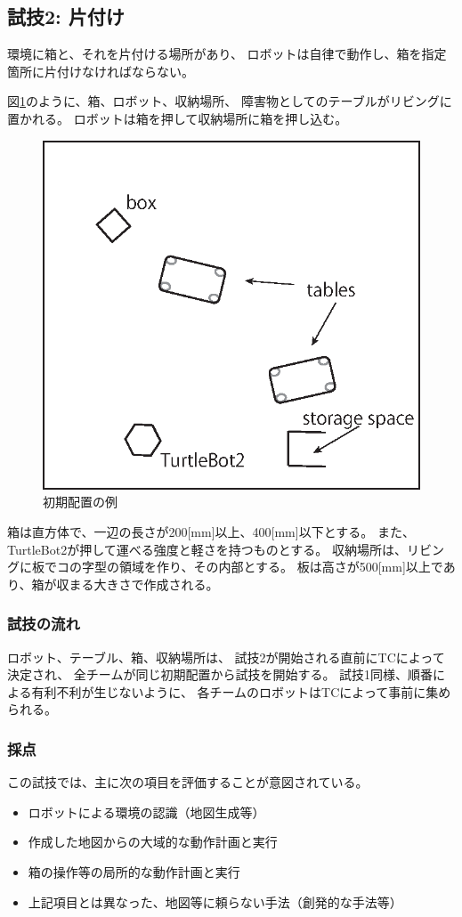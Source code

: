 \documentclass[a4j]{jarticle}
\begin{document}
\subsection{試技2: 片付け}

環境に箱と、それを片付ける場所があり、
ロボットは自律で動作し、箱を指定箇所に片付けなければならない。


図\ref{fig:test2}のように、箱、ロボット、収納場所、
障害物としてのテーブルがリビングに置かれる。
ロボットは箱を押して収納場所に箱を押し込む。

\begin{figure}[h]
	\begin{center}
		\includegraphics[width=0.4\linewidth]{./IMAGE/test2.eps}
		\caption{初期配置の例}
		\label{fig:test2}
	\end{center}
\end{figure}


箱は直方体で、一辺の長さが200[mm]以上、400[mm]以下とする。
また、TurtleBot2が押して運べる強度と軽さを持つものとする。
収納場所は、リビングに板でコの字型の領域を作り、その内部とする。
板は高さが500[mm]以上であり、箱が収まる大きさで作成される。


\subsubsection{試技の流れ}

ロボット、テーブル、箱、収納場所は、
試技2が開始される直前にTCによって決定され、
全チームが同じ初期配置から試技を開始する。
試技1同様、順番による有利不利が生じないように、
各チームのロボットはTCによって事前に集められる。

\subsubsection{採点}

この試技では、主に次の項目を評価することが意図されている。
\begin{itemize}
	\item ロボットによる環境の認識（地図生成等）
	\item 作成した地図からの大域的な動作計画と実行
	\item 箱の操作等の局所的な動作計画と実行
	\item 上記項目とは異なった、地図等に頼らない手法（創発的な手法等）
\end{itemize}
\end{document}
